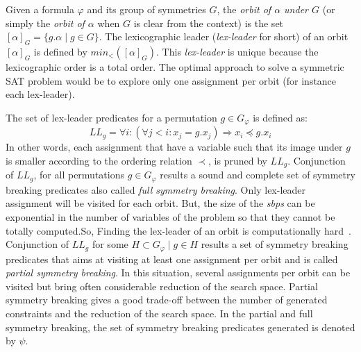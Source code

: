 Given a formula $\varphi$ and its group of symmetries $G$,
the \emph{orbit of $\alpha$ under $G$} (or
simply the \emph{orbit of $\alpha$} when $G$ is clear from the context) is the set
$ [\alpha]_G=\{ g.\alpha \mid g \in G \}$. 
The lexicographic leader (\textit{lex-leader} for short) of an orbit $[\alpha]_G$ is defined by
$min_<([\alpha]_G)$. This \textit{lex-leader} is unique because the lexicographic
order is a total order.
The optimal approach to solve a symmetric SAT problem would be to explore
only one assignment per orbit (for instance each lex-leader).

% 

The set of lex-leader predicates for a permutation $g \in G_\varphi$ is defined as:
$$LL_g = \forall i : (\forall j < i : x_j = g.x_j) \Rightarrow  x_i \preceq g.x_i$$
In other words, each assignment that have a variable such that its image under $g$ is smaller according to the ordering relation $\prec$, is pruned by $LL_g$.
Conjunction of $LL_g$, for all permutations  $g \in G_{\varphi} $ results a sound and complete set of symmetry breaking predicates also called \emph{full symmetry breaking}.
Only lex-leader assignment will be visited 
for each orbit. But,  the size of the \textit{sbps} can be exponential in the number of variables of
the problem so that they cannot be totally computed.So, Finding the lex-leader of an orbit is computationally hard~\cite{Luks2004}. 
Conjunction of $LL_g$ for some $H \subset G_{\varphi} \mid g \in H$ results a set of symmetry breaking predicates 
that aims at visiting at least one assignment per orbit and is called \emph{partial symmetry breaking}.
In this situation, several assignments per orbit can be visited but bring often considerable reduction of the
search space.
Partial symmetry breaking gives a good trade-off between the number of generated constraints and the reduction of the search space.
In the partial and full symmetry breaking, the set of symmetry breaking predicates generated is denoted by $\psi$.

